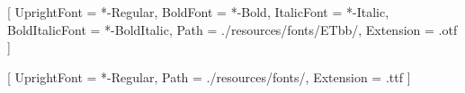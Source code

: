



\setmainfont{ETbb}[
  UprightFont = {*-Regular},
  BoldFont = {*-Bold},
  ItalicFont = {*-Italic},
  BoldItalicFont = {*-BoldItalic},
  Path = {./resources/fonts/ETbb/},
  Extension = {.otf}
]

\setsansfont{SourceSansPro}[
  UprightFont = {*-Regular},
  Path = {./resources/fonts/},
  Extension = {.ttf}
]


\usepackage{amsmath}
\usepackage{unicode-math}


\renewcommand{\partformat}{\thepart}

\newcommand*\partgeometry[1]
  {\newgeometry{marginparwidth=0cm,marginparsep=0cm,showframe,inner=0cm,outer=0cm}}
\let\originalpartheademptypage\partheademptypage
\renewcommand\partheademptypage
  {\originalpartheademptypage\restoregeometry}

